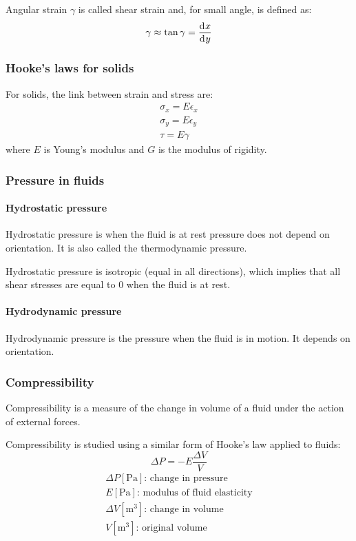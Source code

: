 \documentclass[10pt, twocolumn]{article}
\begin{document}
Angular strain \(\gamma\) is called shear strain and, for small angle, is defined as:
\[
  \gamma \approx \tan\gamma = \frac{\mathrm{d}^{} x}{\mathrm{d}^{} y}
\]


\subsubsection{Hooke's laws for solids}
For solids, the link between strain and stress are:
\begin{align*}
  \sigma_x = E \epsilon_x \\
  \sigma_y = E \epsilon_y \\
  \tau = E \gamma
\end{align*}
where \(E\) is Young's modulus and \(G\) is the modulus of rigidity.


\subsubsection{Pressure in fluids}
\paragraph{Hydrostatic pressure}
Hydrostatic pressure is when the fluid is at rest pressure does not depend on orientation.
It is also called the thermodynamic pressure.

Hydrostatic pressure is isotropic (equal in all directions), which implies that all shear stresses  are equal to 0 when the fluid is at rest.


\paragraph{Hydrodynamic pressure}
Hydrodynamic pressure is the pressure when the fluid is in motion.
It depends on orientation.


\subsubsection{Compressibility}
Compressibility is a measure of the change in volume of a fluid under the action of external forces.

Compressibility is studied using a similar form of Hooke's law applied to fluids:
\[
  \Delta P = -E \frac{\Delta V}{V}
\]
\[
  \begin{array}{|l}
    \Delta P [\si{\pascal}] \text{: change in pressure}    \\
    E [\si{\pascal}] \text{: modulus of fluid elasticity}  \\
    \Delta V [\si{\metre\cubed}] \text{: change in volume} \\
    V [\si{\metre\cubed}] \text{: original volume}
  \end{array}
\]
\end{document}
